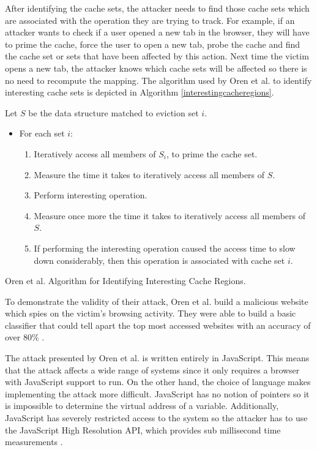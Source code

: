 \documentclass[10pt,a4paper,twoside]{book}
\begin{document}
After identifying the cache sets, the attacker needs to find those cache sets which are associated with the operation they are trying to track. For example, if an attacker wants to check if a user opened a new tab in the browser, they will have to prime the cache, force the user to open a new tab, probe the cache and find the cache set or sets that have been affected by this action. Next time the victim opens a new tab, the attacker knows which cache sets will be affected so there is no need to recompute the mapping. The algorithm used by Oren et al. to identify interesting cache sets is depicted in Algorithm \ref{interestingcacheregions}.

\begin{algorithm}
Let $S$ be the data structure matched to eviction set $i$.
\begin{itemize}
\item For each set $i$:
\begin{enumerate}
\item Iteratively access all members of $S_i$, to prime the cache set.
\item Measure the time it takes to iteratively access all members of $S$.
\item Perform interesting operation.
\item Measure once more the time it takes to iteratively access all members of $S$.
\item If performing the interesting operation caused the access time to slow down considerably, then this operation is associated with cache set $i$.
\end{enumerate}
\end{itemize}
\caption{Oren et al. Algorithm for Identifying Interesting Cache Regions.}
\label{interestingcacheregions}
\end{algorithm}

To demonstrate the validity of their attack, Oren et al. build a malicious website which spies on the victim's browsing activity. They were able to build a basic classifier that could tell apart the top most accessed websites with an accuracy of over 80\% \cite{oren2015spy}.

The attack presented by Oren et al. is written entirely in JavaScript. This means that the attack affects a wide range of systems since it only requires a browser with JavaScript support to run. On the other hand, the choice of language makes implementing the attack more difficult. JavaScript has no notion of pointers so it is impossible to determine the virtual address of a variable. Additionally, JavaScript has severely restricted access to the system so the attacker has to use the JavaScript High Resolution API, which provides sub millisecond time measurements \cite{oren2015spy}.
\end{document}
